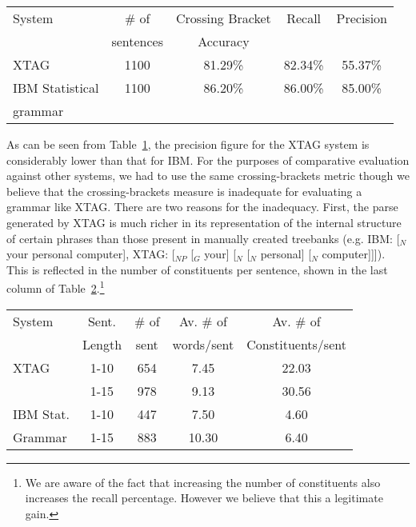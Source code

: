 \begin{table}[ht] 
\centering 
\begin{tabular}{|l|c|c|c|c|} \hline 
System & \# of & Crossing Bracket & Recall & Precision \\ 
& sentences & Accuracy & & \\ \hline 
XTAG & 1100 & 81.29\% & 82.34\% & 55.37\% \\ \hline 
IBM Statistical & 1100 & 86.20\% & 86.00\% & 85.00\% \\ 
grammar & &  &  &\\ \hline 
\end{tabular} 
 
\vspace{0.1in} 
 
\begin{rawhtml} <dl> <dt>{Performance of XTAG on IBM-manual sentences <p> </dl> \end{rawhtml}
\label{ibm-results} 
 
\end{table} 
 
As can be seen from Table~\ref{ibm-results}, the precision figure for 
the XTAG system is considerably lower than that for IBM. For the 
purposes of comparative evaluation against other systems, we had to 
use the same crossing-brackets metric though we believe that the 
crossing-brackets measure is inadequate for evaluating a grammar like 
XTAG. There are two reasons for the inadequacy. First, the parse 
generated by XTAG is much richer in its representation of the internal 
structure of certain phrases than those present in manually created 
treebanks (e.g. IBM: [$_N$ your personal computer], XTAG: [$_{NP}$ 
[$_G$ your] [$_N$ [$_N$ personal] [$_N$ computer]]]). This is 
reflected in the number of constituents per sentence, shown in the 
last column of Table~\ref{const-no}.\footnote{We are aware of the fact   that increasing the number of constituents also increases the recall   percentage. However we believe that this a legitimate gain.} 
 
\begin{table}[ht] 
\centering 
\begin{tabular}{|l|c|c|c|c|} \hline 
System & Sent. & \# of & Av. \# of & Av. \# of \\ 
& Length & sent & words/sent & Constituents/sent \\ \hline 
XTAG & 1-10 & 654 & 7.45 & 22.03  \\ \cline{2-5} 
& 1-15 & 978 & 9.13 & 30.56 \\ \hline 
IBM Stat. & 1-10 & 447 & 7.50 & 4.60 \\ \cline{2-5} 
Grammar & 1-15 & 883 & 10.30 & 6.40 \\ \hline 
\end{tabular} 
\begin{rawhtml} <dl> <dt>{Constituents in XTAG parse and IBM parse <p> </dl> \end{rawhtml}
\label{const-no} 
\end{table} 
 
